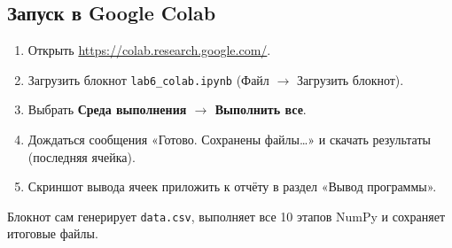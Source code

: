 \documentclass[oneside,a4paper,14pt]{extarticle}
\begin{document}
\begin{flushleft}
\section*{Запуск в Google Colab}

\begin{enumerate}
\item Открыть \url{https://colab.research.google.com/}.
\item Загрузить блокнот \texttt{lab6\_colab.ipynb} (Файл $\rightarrow$ Загрузить блокнот).
\item Выбрать \textbf{Среда выполнения $\rightarrow$ Выполнить все}.
\item Дождаться сообщения «Готово. Сохранены файлы…» и скачать результаты (последняя ячейка).
\item Скриншот вывода ячеек приложить к отчёту в раздел «Вывод программы».
\end{enumerate}

Блокнот сам генерирует \texttt{data.csv}, выполняет все 10 этапов NumPy и сохраняет итоговые файлы.
\end{flushleft}
\end{document}
